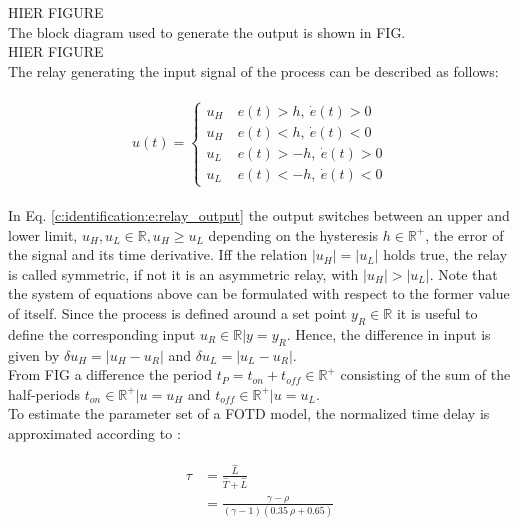 HIER FIGURE \\

The block diagram used to generate the output is shown in FIG. \\

HIER FIGURE \\

The relay generating the input signal of the process can be described as follows:

\begin{align}
\begin{split}
u(t) = \begin{cases}
u_H &~e(t) > h, ~\dot{e}(t) > 0 \\
u_H &~e(t) < h, ~\dot{e}(t) < 0\\
u_L &~e(t) > -h,~\dot{e}(t) > 0\\
u_L &~e(t) < -h, ~\dot{e}(t) < 0
\end{cases}
\end{split}
\label{c:identification:e:relay_output}
\end{align}

In Eq. \ref{c:identification:e:relay_output} the output switches between an upper and lower limit, $u_H, u_L \in \mathbb{R}, u_H \geq u_L$ depending on the hysteresis $h \in \mathbb{R}^+$, the error of the signal and its time derivative. Iff the relation $\left| u_H \right| = \left| u_L \right|$ holds true, the relay is called symmetric, if not it is an asymmetric relay, with $\left| u_H \right| > \left| u_L \right|$. Note that the system of equations above can be formulated with respect to the former value of itself. Since the process is defined around a set point $y_R \in \mathbb{R}$ it is useful to define the corresponding input $u_R \in \mathbb{R} | y = y_R$. Hence, the difference in input is given by $\delta u_H = \left| u_H-u_R \right|$ and $\delta u_L = \left| u_L - u_R \right|$.\\

From FIG a difference the period $t_P = t_{on} + t_{off}\in \mathbb{R}^+$ consisting of the sum of the half-periods $t_{on} \in \mathbb{R}^+ | u = u_H$ and $t_{off} \in \mathbb{R}^+ | u = u_L$.\\

To estimate the parameter set of a FOTD model, the normalized time delay is approximated according to \cite[p.26 f.]{Berner2015}:

\begin{align}
\begin{split}
\tau &= \frac{\hat{L}}{\hat{T}+\hat{L}} \\
 &= \frac{\gamma - \rho}{ \left(\gamma - 1\right)\left(0.35~\rho+0.65\right)}
\end{split}
\label{c:identification:e:relay_normalizedtime}
\end{align}

